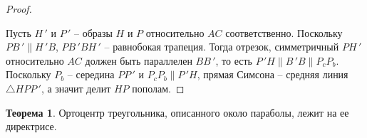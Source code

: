 \documentclass[12pt]{article}
\theoremstyle{definition}
\newtheorem{theorem}{Теорема}[section]
\begin{document}
\begin{proof}
\begin{center}
        \end{center}
        Пусть $H\,'$ и $P\,'$ -- образы $H$ и $P$ относительно $AC$ соответственно. Поскольку $PB\,'\parallel H\,'B$, $PB\,'BH\,'$ -- равнобокая трапеция. Тогда отрезок, симметричный $PH\,'$ относительно $AC$ должен быть параллелен $BB\,'$, то есть $P\,'H\parallel B\,'B\parallel P_cP_b$. Поскольку $P_b$ -- середина $PP\,'$ и $P_cP_b\parallel P\,'H$, прямая Симсона -- средняя линия $\triangle HPP\,'$, а значит делит $HP$ пополам.
    \end{proof}
    \begin{theorem}
        Ортоцентр треугольника, описанного около параболы, лежит на ее директрисе.
    \end{theorem}
\end{document}
